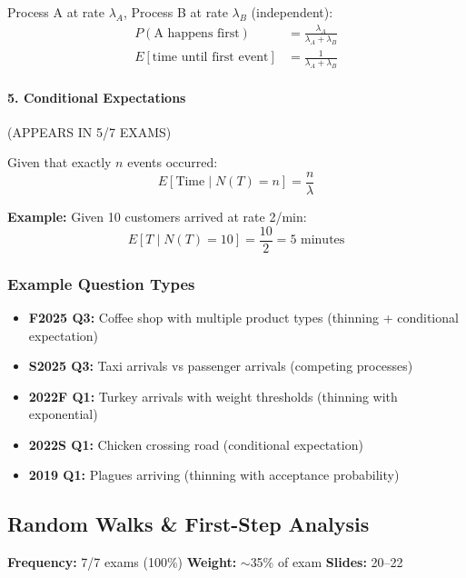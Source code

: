 \documentclass[11pt,letterpaper]{article}
\begin{document}
Process A at rate $\lambda_A$, Process B at rate $\lambda_B$ (independent):
\begin{align*}
P(\text{A happens first}) &= \frac{\lambda_A}{\lambda_A + \lambda_B} \\
E[\text{time until first event}] &= \frac{1}{\lambda_A + \lambda_B}
\end{align*}

\paragraph{5. Conditional Expectations} \textcolor{criticalcolor}{(APPEARS IN 5/7 EXAMS)}

\begin{tcolorbox}[colback=yellow!10,colframe=orange!80,title=Conditional Expectation with Poisson]
Given that exactly $n$ events occurred:
\[
E[\text{Time} \mid N(T) = n] = \frac{n}{\lambda}
\]

\textbf{Example:} Given 10 customers arrived at rate 2/min:
\[
E[T \mid N(T) = 10] = \frac{10}{2} = 5 \text{ minutes}
\]
\end{tcolorbox}

\subsubsection{Example Question Types}

\begin{itemize}[leftmargin=*]
  \item \textbf{F2025 Q3:} Coffee shop with multiple product types (thinning + conditional expectation)
  \item \textbf{S2025 Q3:} Taxi arrivals vs passenger arrivals (competing processes)
  \item \textbf{2022F Q1:} Turkey arrivals with weight thresholds (thinning with exponential)
  \item \textbf{2022S Q1:} Chicken crossing road (conditional expectation)
  \item \textbf{2019 Q1:} Plagues arriving (thinning with acceptance probability)
\end{itemize}

\newpage

\subsection{Random Walks \& First-Step Analysis}

\textbf{Frequency:} 7/7 exams (100\%) \quad \textbf{Weight:} $\sim$35\% of exam \quad \textbf{Slides:} 20--22
\end{document}
